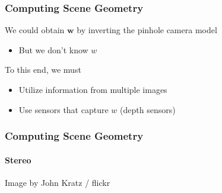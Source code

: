 \documentclass[xetex,professionalfont]{beamer}
\renewcommand{\vec}[1]{\ensuremath{\mathbf{#1}}}
\newcommand{\vw}{\vec{w}}
\begin{document}
\begin{frame}
\frametitle{Computing Scene Geometry}

We could obtain $\vw$ by inverting the pinhole camera model %
\begin{itemize}
    \item But we don't know $w$ %
\end{itemize}

\bigskip
To this end, we must
\begin{itemize}
    \item Utilize information from multiple images %
    \item Use sensors that capture $w$ (depth sensors)
\end{itemize}


\end{frame}


\begin{frame}
\frametitle{Computing Scene Geometry}
\framesubtitle{Stereo}

\begin{center}
    {\centering Image by John Kratz / flickr}
\end{center}

\end{frame}
\end{document}

